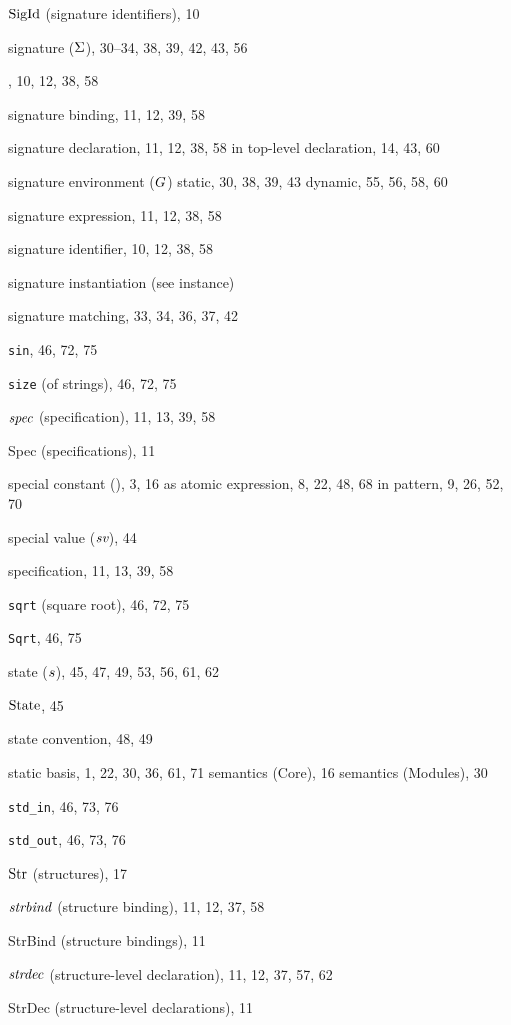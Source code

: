 \begin{theindex}
\item ${\rm SigId}$ (signature identifiers), 10
\item signature ($\Sigma$), 30--34, 38, 39, 42, 43, 56
\item \SIGNATURE, 10, 12, 38, 58
\item signature binding, 11, 12, 39, 58
\item signature declaration, 11, 12, 38, 58
\subitem in top-level declaration, 14, 43, 60
\item signature environment ($G$) 
\subitem static, 30, 38, 39, 43
\subitem dynamic, 55, 56, 58, 60
\item signature expression, 11, 12, 38, 58
\item signature identifier, 10, 12, 38, 58
\item signature instantiation (see instance) 
\item signature matching, 33, 34, 36, 37, 42
\item {\tt sin}, 46, 72, 75
\item {\tt size} (of strings), 46, 72, 75
\item ${\it spec}$ (specification), 11, 13, 39, 58
\item Spec (specifications), 11
\item special constant (\scon), 3, 16
\subitem as atomic expression, 8, 22, 48, 68
\subitem in pattern, 9, 26, 52, 70
\item special value ($\mbox{\it sv}$), 44
\item specification, 11, 13, 39, 58
\item {\tt sqrt} (square root), 46, 72, 75
\item {\tt Sqrt}, 46, 75
\item state ($s$), 45, 47, 49, 53, 56, 61, 62
\item ${\rm State}$, 45
\item state convention, 48, 49
\item static 
\subitem basis, 1, 22, 30, 36, 61, 71
\subitem semantics (Core), 16
\subitem semantics (Modules), 30
\item \verb+std_in+, 46, 73, 76
\item \verb+std_out+, 46, 73, 76
\item ${\rm Str}$ (structures), 17
\item ${\it strbind}$ (structure binding), 11, 12, 37, 58
\item StrBind (structure bindings), 11
\item ${\it strdec}$ (structure-level declaration), 11, 12, 37, 57, 62
\item StrDec (structure-level declarations), 11

\end{theindex}
